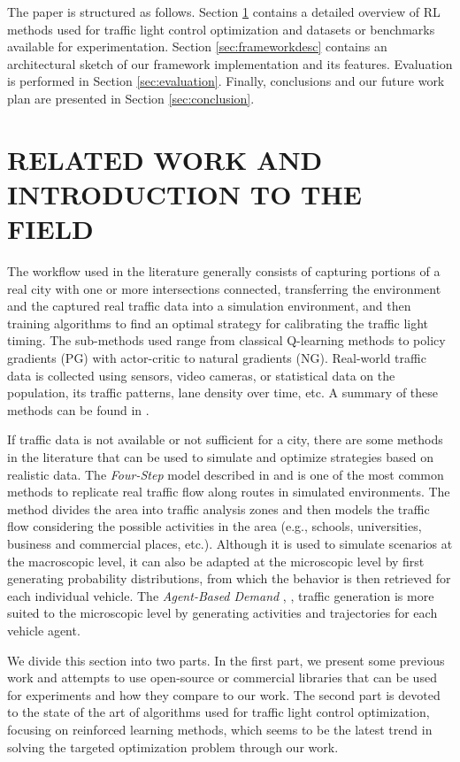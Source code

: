 \documentclass[a4paper,twoside]{article}
\begin{document}
The paper is structured as follows. Section \ref{sec:relatedwork} contains a detailed overview of RL methods used for traffic light control optimization and datasets or benchmarks available for experimentation. Section \ref{sec:frameworkdesc} contains an architectural sketch of our framework implementation and its features. Evaluation is performed in Section \ref{sec:evaluation}. Finally, conclusions and our future work plan are presented in Section \ref{sec:conclusion}.

\section{\uppercase{Related work and Introduction to the field}} \label{sec:relatedwork}

The workflow used in the literature generally consists of capturing portions of a real city with one or more intersections connected, transferring the environment and the captured real traffic data into a simulation environment, and then training algorithms to find an optimal strategy for calibrating the traffic light timing. The sub-methods used range from classical Q-learning methods to policy gradients (PG) with actor-critic to natural gradients (NG). Real-world traffic data is collected using sensors, video cameras, or statistical data on the population, its traffic patterns, lane density over time, etc. A summary of these methods can be found in \cite{SUMBA}. 

If traffic data is not available or not sufficient for a city, there are some methods in the literature that can be used to simulate and optimize strategies based on realistic data. The \textit{Four-Step} model described in \cite{ModellingTransport} and \cite{HandbookTransportModelling} is one of the most common methods to replicate real traffic flow along routes in simulated environments. The method divides the area into traffic analysis zones and then models the traffic flow considering the possible activities in the area (e.g., schools, universities, business and commercial places, etc.). Although it is used to simulate scenarios at the macroscopic level, it can also be adapted at the microscopic level by first generating probability distributions, from which the behavior is then retrieved for each individual vehicle. The \textit{Agent-Based Demand} \cite{SUMBA}, \cite{Innes2011}, traffic generation is more suited to the microscopic level by generating activities and trajectories for each vehicle agent.

We divide this section into two parts. In the first part, we present some previous work and attempts to use open-source or commercial libraries that can be used for experiments and how they compare to our work. The second part is devoted to the state of the art of algorithms used for traffic light control optimization, focusing on reinforced learning methods, which seems to be the latest trend in solving the targeted optimization problem through our work.
\end{document}
